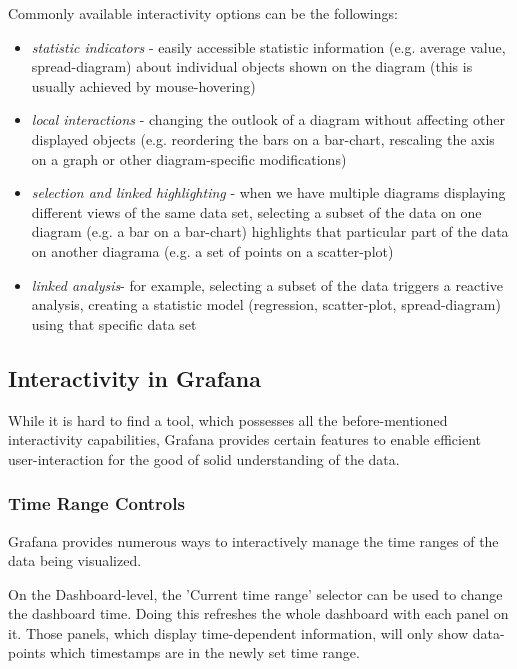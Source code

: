 Commonly available interactivity options can be the followings:
\begin{itemize}
	\item \emph{statistic indicators} - easily accessible statistic information (e.g. average value, spread-diagram) about individual objects shown on the diagram (this is usually achieved by mouse-hovering)
	\item \emph{local interactions} - changing the outlook of a diagram without affecting other displayed objects (e.g. reordering the bars on a bar-chart, rescaling the axis on a graph or other diagram-specific modifications)
	\item \emph{selection and linked highlighting} - when we have multiple diagrams displaying different views of the same data set, selecting a subset of the data on one diagram (e.g. a bar on a bar-chart) highlights that particular part of the data on another diagrama (e.g. a set of points on a scatter-plot)
	\item \emph{linked analysis}- for example, selecting a subset of the data triggers a reactive analysis, creating a statistic model (regression, scatter-plot, spread-diagram) using that specific data set
\end{itemize}

\subsection{Interactivity in Grafana}

While it is hard to find a tool, which possesses all the before-mentioned interactivity capabilities, Grafana provides certain features to enable efficient user-interaction for the good of solid understanding of the data.


\subsubsection{Time Range Controls}

Grafana provides numerous ways to interactively manage the time ranges of the data being visualized.

On the Dashboard-level, the 'Current time range' selector can be used to change the dashboard time. Doing this refreshes the whole dashboard with each panel on it. Those panels, which display time-dependent information, will only show data-points which timestamps are in the newly set time range.

